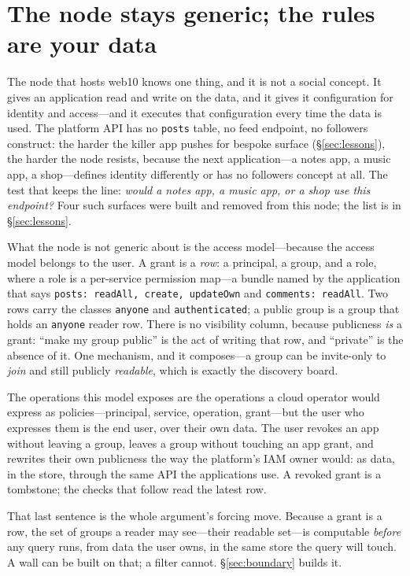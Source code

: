 \documentclass[sigconf, nonacm]{acmart}
\begin{document}
\section{The node stays generic; the rules are your data}
\label{sec:access}

The node that hosts web10 knows one thing, and it is not a social
concept. It gives an application read and write on the data, and it
gives it configuration for identity and access---and it executes that
configuration every time the data is used. The platform API has no
\texttt{posts} table, no feed endpoint, no followers construct: the
harder the killer app pushes for bespoke surface (\S\ref{sec:lessons}),
the harder the node resists, because the next application---a notes app,
a music app, a shop---defines identity differently or has no followers
concept at all. The test that keeps the line: \emph{would a notes app, a
music app, or a shop use this endpoint?} Four such surfaces were built
and removed from this node; the list is in \S\ref{sec:lessons}.

What the node is not generic about is the access model---because the
access model belongs to the user. A grant is a \emph{row}: a principal,
a group, and a role, where a role is a per-service permission map---a
bundle named by the application that says \texttt{posts: readAll,
create, updateOwn} and \texttt{comments: readAll}. Two rows carry the
classes \texttt{anyone} and \texttt{authenticated}; a public group is a
group that holds an \texttt{anyone} reader row. There is no visibility
column, because publicness \emph{is} a grant: ``make my group public''
is the act of writing that row, and ``private'' is the absence of it.
One mechanism, and it composes---a group can be invite-only to
\emph{join} and still publicly \emph{readable}, which is exactly the
discovery board.

The operations this model exposes are the operations a cloud operator
would express as policies---principal, service, operation, grant---but
the user who expresses them is the end user, over their own data. The
user revokes an app without leaving a group, leaves a group without
touching an app grant, and rewrites their own publicness the way the
platform's IAM owner would: as data, in the store, through the same API
the applications use. A revoked grant is a tombstone; the checks that
follow read the latest row.

That last sentence is the whole argument's forcing move. Because a
grant is a row, the set of groups a reader may see---their readable
set---is computable \emph{before} any query runs, from data the user
owns, in the same store the query will touch. A wall can be built on
that; a filter cannot. \S\ref{sec:boundary} builds it.
\end{document}
